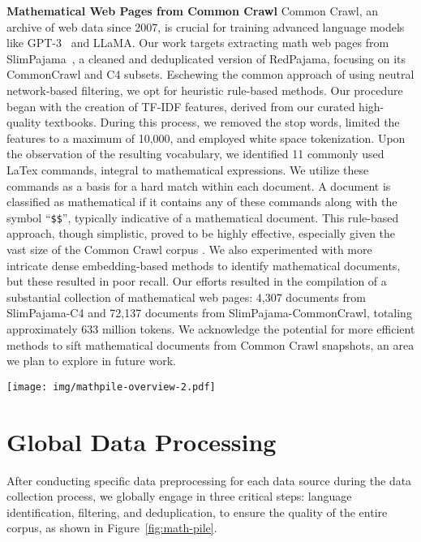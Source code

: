 \noindent\textbf{Mathematical Web Pages from Common Crawl} \quad Common Crawl, an archive of web data since 2007, is crucial for training advanced language models like GPT-3~\citep{DBLP:conf/nips/BrownMRSKDNSSAA20-gpt-3} and LLaMA. Our work targets extracting math web pages from SlimPajama~\citep{SlimPajama}, a cleaned and deduplicated version of RedPajama, focusing on its CommonCrawl and C4 subsets. Eschewing the common approach of using neutral network-based filtering, we opt for heuristic rule-based methods. Our procedure began with the creation of TF-IDF features, derived from our curated high-quality textbooks. During this process, we removed the stop words, limited the features to a maximum of 10,000, and employed white space tokenization. Upon the observation of the resulting vocabulary, we identified 11 commonly used LaTex commands, integral to mathematical expressions. We utilize these commands as a basis for a hard match within each document. A document is classified as mathematical if it contains any of these commands along with the symbol  ``\texttt{\$\$}'', typically indicative of a mathematical document. This rule-based approach, though simplistic, proved to be highly effective, especially given the vast size of the Common Crawl corpus
. We also experimented with more intricate dense embedding-based methods to identify mathematical documents, but these resulted in poor recall. Our efforts resulted in the compilation of a substantial collection of mathematical web pages: 4,307 documents from SlimPajama-C4 and 72,137 documents from SlimPajama-CommonCrawl, totaling approximately 633 million tokens. We acknowledge the potential for more efficient methods to sift mathematical documents from Common Crawl snapshots, an area we plan to explore in future work.

\begin{figure*}[h]
\centering 
\texttt{[image: img/mathpile-overview-2.pdf]} 
\caption{The creation process of \mathpile. We additionally perform data contamination detection on benchmark test sets (cf. \S~\ref{sec:data-contamination-detection}). We visualize its component ratios by document counts (Right).} 
\label{fig:math-pile}
\end{figure*}

\section{Global Data Processing}
\label{sec:global-data-processing}

After conducting specific data preprocessing for each data source during the data collection process, we globally engage in three critical steps: language identification,  filtering, and deduplication, to ensure the quality of the entire corpus, as shown in Figure~\ref{fig:math-pile}.

